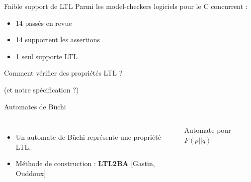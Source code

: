 \documentclass{beamer}
\begin{document}
\begin{frame}{Faible support de LTL}
  Parmi les model-checkers logiciels pour le C concurrent :
  \begin{itemize}
    \item 14 passés en revue
    \item 14 supportent les assertions
    \item 1 seul supporte LTL
  \end{itemize}
\end{frame}

\begin{frame}[standout]
  Comment vérifier des propriétés LTL ?

  \vspace{2em}
  \small (et notre spécification ?)
\end{frame}

\begin{frame}{Automates de Büchi}
  \begin{columns}[onlytextwidth, c]

    \begin{itemize}
      \setlength{\itemsep}{1.5em}
    \item Un automate de Büchi représente une propriété LTL.
    \item Méthode de construction : \textbf{LTL2BA} [Gastin, Ouddoux]
    \end{itemize}

    \begin{center}
    Automate pour $F (p || q)$
    \vspace{1em}

    \end{center}

  \end{columns}

\end{frame}
\end{document}
